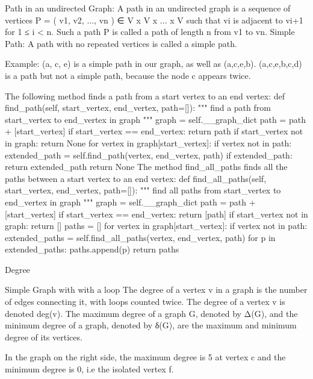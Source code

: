 Path in an undirected Graph: 
A path in an undirected graph is a sequence of vertices P = ( v1, v2, ..., vn ) ∈ V x V x ... x V such that vi is adjacent to v{i+1} for 1 ≤ i < n. Such a path P is called a path of length n from v1 to vn. 
Simple Path: 
A path with no repeated vertices is called a simple path. 

Example: 
(a, c, e) is a simple path in our graph, as well as (a,c,e,b). (a,c,e,b,c,d) is a path but not a simple path, because the node c appears twice. 

The following method finds a path from a start vertex to an end vertex:
    def find_path(self, start_vertex, end_vertex, path=[]):
        """ find a path from start_vertex to end_vertex 
            in graph """
        graph = self.__graph_dict
        path = path + [start_vertex]
        if start_vertex == end_vertex:
            return path
        if start_vertex not in graph:
            return None
        for vertex in graph[start_vertex]:
            if vertex not in path:
                extended_path = self.find_path(vertex, 
                                               end_vertex, 
                                               path)
                if extended_path: 
                    return extended_path
        return None
The method find_all_paths finds all the paths between a start vertex to an end vertex:
    def find_all_paths(self, start_vertex, end_vertex, path=[]):
        """ find all paths from start_vertex to 
            end_vertex in graph """
        graph = self.__graph_dict 
        path = path + [start_vertex]
        if start_vertex == end_vertex:
            return [path]
        if start_vertex not in graph:
            return []
        paths = []
        for vertex in graph[start_vertex]:
            if vertex not in path:
                extended_paths = self.find_all_paths(vertex, 
                                                     end_vertex, 
                                                     path)
                for p in extended_paths: 
                    paths.append(p)
        return paths


Degree

Simple Graph with with a loop The degree of a vertex v in a graph is the number of edges connecting it, with loops counted twice. The degree of a vertex v is denoted deg(v). The maximum degree of a graph G, denoted by Δ(G), and the minimum degree of a graph, denoted by δ(G), are the maximum and minimum degree of its vertices. 

In the graph on the right side, the maximum degree is 5 at vertex c and the minimum degree is 0, i.e the isolated vertex f. 


